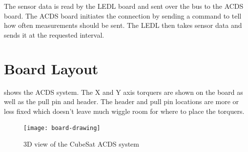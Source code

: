 The sensor data is read by the \ac{LEDL} board and sent over the bus to the \ac{ACDS} board. The \ac{ACDS} board initiates the connection by sending a command to tell how often measurements should be sent. The \ac{LEDL} then takes sensor data and sends it at the requested interval.

\section{Board Layout}

 shows the \ac{ACDS} system. The X and Y axis torquers are shown on the board as well as the pull pin and header. The header and pull pin locations are more or less fixed which doesn't leave much wiggle room for where to place the torquers.

\begin{figure}[H]
    \centering
    \texttt{[image: board-drawing]}
    \caption{3D view of the CubeSat \acs{ACDS} system}
    \label{fig:3dview}
\end{figure}

